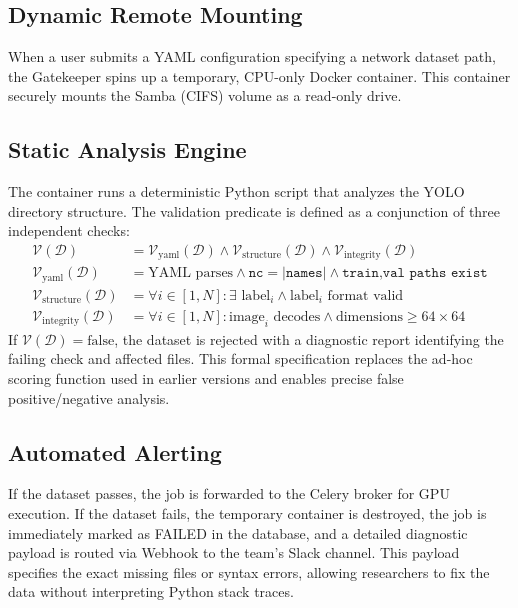 \documentclass[10pt,twocolumn,letterpaper]{article}
\begin{document}
\subsection{Dynamic Remote Mounting}
When a user submits a YAML configuration specifying a network dataset path, the Gatekeeper spins up a temporary, CPU-only Docker container. This container securely mounts the Samba (CIFS) volume as a read-only drive.

\subsection{Static Analysis Engine}
The container runs a deterministic Python script that analyzes the YOLO directory structure. The validation predicate is defined as a conjunction of three independent checks:
\begin{align}
    \mathcal{V}(\mathcal{D}) &= \mathcal{V}_{\text{yaml}}(\mathcal{D}) \land \mathcal{V}_{\text{structure}}(\mathcal{D}) \land \mathcal{V}_{\text{integrity}}(\mathcal{D}) \\
    \mathcal{V}_{\text{yaml}}(\mathcal{D}) &= \text{YAML parses} \land \texttt{nc} = |\texttt{names}| \land \texttt{train,val paths exist} \\
    \mathcal{V}_{\text{structure}}(\mathcal{D}) &= \forall i \in [1,N] : \exists \text{ label}_i \land \text{label}_i \text{ format valid} \\
    \mathcal{V}_{\text{integrity}}(\mathcal{D}) &= \forall i \in [1,N] : \text{image}_i \text{ decodes} \land \text{dimensions} \ge 64 \times 64
\end{align}
If $\mathcal{V}(\mathcal{D}) = \text{false}$, the dataset is rejected with a diagnostic report identifying the failing check and affected files. This formal specification replaces the ad-hoc scoring function used in earlier versions and enables precise false positive/negative analysis.

\subsection{Automated Alerting}
If the dataset passes, the job is forwarded to the Celery broker for GPU execution. If the dataset fails, the temporary container is destroyed, the job is immediately marked as FAILED in the database, and a detailed diagnostic payload is routed via Webhook to the team's Slack channel. This payload specifies the exact missing files or syntax errors, allowing researchers to fix the data without interpreting Python stack traces.
\end{document}
